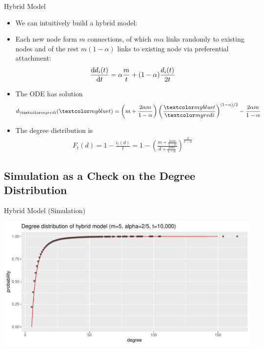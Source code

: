 \documentclass{beamer}
\begin{document}
\begin{frame}{Hybrid Model}
	\begin{itemize}
		\item
			We can intuitively build a hybrid model:
		\item
			Each new node form $m$ connections,
			of which $m\alpha$ links randomly to existing nodes and
			of the rest $m(1-\alpha)$ links to existing node via preferential attachment:
			\begin{align*}
				\D{t}{d_{i}(t)} = \alpha\frac{m}{t} + (1-\alpha)\frac{d_{i}(t)}{2t}
			\end{align*}
		\item
			The ODE has solution
			\begin{align*}
				d_{\red{i}}(\blue{t})
				= \left(m+\frac{2\alpha m}{1-\alpha}\right)\left(\frac{\blue{t}}{\red{i}}\right)^{(1-\alpha)/2}
				- \frac{2\alpha m}{1-\alpha}
			\end{align*}
		\item
			The degree distribution is
			\begin{align}\label{eq:hybrid_cdf}
				F_{t}(d)
				= 1 - \frac{i_{t}(d)}{t}
				= 1 - \left(\frac{m+\frac{2\alpha m}{1-\alpha}}{d+\frac{2\alpha m}{1-\alpha}}\right)^{\frac{2}{1-\alpha}}
			\end{align}
	\end{itemize}
\end{frame}

\subsection*{Simulation as a Check on the Degree Distribution}

\begin{frame}{Hybrid Model (Simulation)}
	\begin{center}
		\includegraphics[width=\textwidth]{figures-R/hybrid-cdf.pdf}
	\end{center}
\end{frame}
\end{document}
